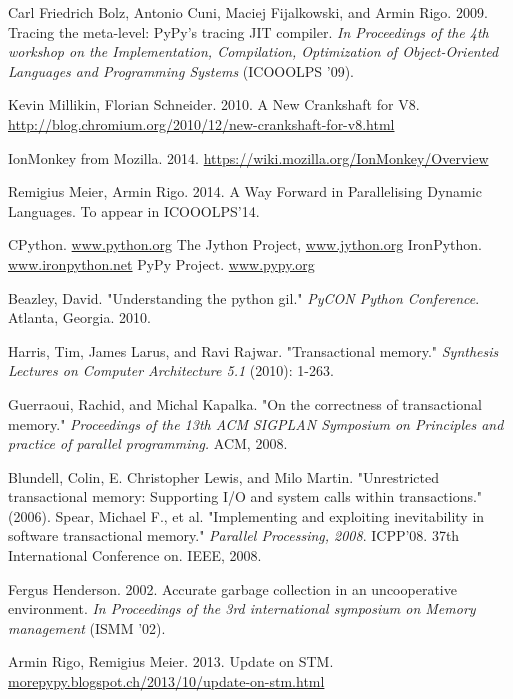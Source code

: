\documentclass{sigplanconf}
\begin{document}
\begin{thebibliography}{}
\softraggedright

 Carl Friedrich Bolz, Antonio Cuni, Maciej
  Fijalkowski, and Armin Rigo. 2009. Tracing the meta-level: PyPy's
  tracing JIT compiler.  \emph{In Proceedings of the 4th workshop on the
    Implementation, Compilation, Optimization of Object-Oriented Languages
    and Programming Systems} (ICOOOLPS '09).

 Kevin Millikin, Florian Schneider. 2010.  A New
  Crankshaft for V8.
  \url{http://blog.chromium.org/2010/12/new-crankshaft-for-v8.html}

 IonMonkey from Mozilla. 2014.
  \url{https://wiki.mozilla.org/IonMonkey/Overview}

 Remigius Meier, Armin Rigo. 2014. A Way Forward
  in Parallelising Dynamic Languages. To appear in ICOOOLPS'14.

 CPython. \url{www.python.org}
 The Jython Project, \url{www.jython.org}
 IronPython. \url{www.ironpython.net}
 PyPy Project. \url{www.pypy.org}

 Beazley, David. "Understanding the python gil."
  \emph{PyCON Python Conference}. Atlanta, Georgia. 2010.

 Harris, Tim, James Larus, and Ravi
  Rajwar. "Transactional memory." \emph{Synthesis Lectures on Computer
  Architecture 5.1} (2010): 1-263.

 Guerraoui, Rachid, and Michal Kapalka. "On the
  correctness of transactional memory." \emph{Proceedings of the 13th
    ACM SIGPLAN Symposium on Principles and practice of parallel
    programming.} ACM, 2008.

 Blundell, Colin, E. Christopher Lewis, and Milo
  Martin. "Unrestricted transactional memory: Supporting I/O and system
  calls within transactions." (2006).
 Spear, Michael F., et al. "Implementing and
  exploiting inevitability in software transactional memory."
  \emph{Parallel Processing, 2008}. ICPP'08. 37th International
  Conference on. IEEE, 2008.

 Fergus Henderson. 2002. Accurate garbage collection
  in an uncooperative environment. \emph{In Proceedings of the 3rd
    international symposium on Memory management} (ISMM '02).

 Armin Rigo, Remigius Meier. 2013. Update on
  STM. \url{morepypy.blogspot.ch/2013/10/update-on-stm.html}


\end{thebibliography}
\end{document}
